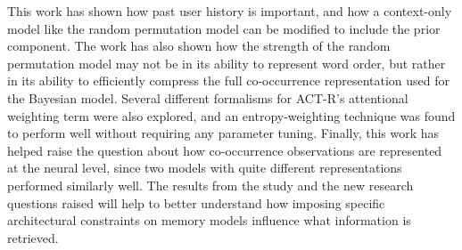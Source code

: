\documentclass[man,floatsintext,donotrepeattitle]{apa6}
\begin{document}
This work has shown how past user history is important, and how a context-only model like the random permutation model can be modified to include the prior component.
The work has also shown how the strength of the random permutation model may not be in its ability to represent word order,
but rather in its ability to efficiently compress the full co-occurrence representation used for the Bayesian model.
Several different formalisms for ACT-R's attentional weighting term were also explored, and an entropy-weighting technique was found to perform well without requiring any parameter tuning.
Finally, this work has helped raise the question about how co-occurrence observations are represented at the neural level, since two models with quite different representations performed similarly well.
The results from the study and the new research questions raised will help to better understand how imposing specific architectural constraints on memory models influence what information is retrieved.

\clearpage
\printbibliography[heading=bibintoc]
\end{document}
